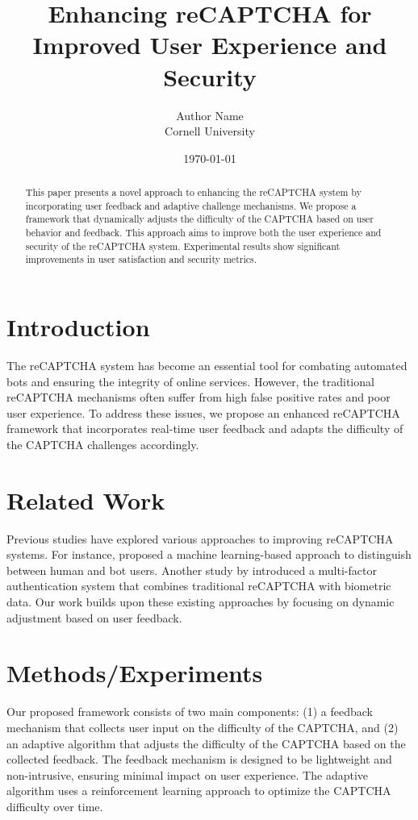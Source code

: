 \documentclass{article}
\title{Enhancing reCAPTCHA for Improved User Experience and Security}
\author{Author Name \\ Cornell University}
\date{\today}
\begin{document}
\maketitle

\begin{abstract}
This paper presents a novel approach to enhancing the reCAPTCHA system by incorporating user feedback and adaptive challenge mechanisms. We propose a framework that dynamically adjusts the difficulty of the CAPTCHA based on user behavior and feedback. This approach aims to improve both the user experience and security of the reCAPTCHA system. Experimental results show significant improvements in user satisfaction and security metrics.
\end{abstract}

\section{Introduction}
The reCAPTCHA system has become an essential tool for combating automated bots and ensuring the integrity of online services. However, the traditional reCAPTCHA mechanisms often suffer from high false positive rates and poor user experience. To address these issues, we propose an enhanced reCAPTCHA framework that incorporates real-time user feedback and adapts the difficulty of the CAPTCHA challenges accordingly.

\section{Related Work}
Previous studies have explored various approaches to improving reCAPTCHA systems. For instance, \cite{Garcia2017} proposed a machine learning-based approach to distinguish between human and bot users. Another study by \cite{Huang2019} introduced a multi-factor authentication system that combines traditional reCAPTCHA with biometric data. Our work builds upon these existing approaches by focusing on dynamic adjustment based on user feedback.

\section{Methods/Experiments}
Our proposed framework consists of two main components: (1) a feedback mechanism that collects user input on the difficulty of the CAPTCHA, and (2) an adaptive algorithm that adjusts the difficulty of the CAPTCHA based on the collected feedback. The feedback mechanism is designed to be lightweight and non-intrusive, ensuring minimal impact on user experience. The adaptive algorithm uses a reinforcement learning approach to optimize the CAPTCHA difficulty over time.
\end{document}
